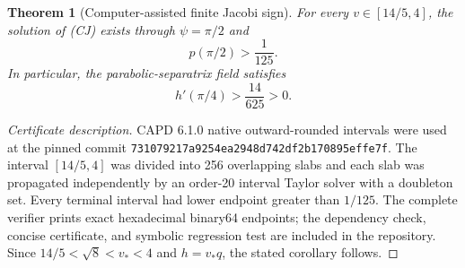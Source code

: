 \documentclass[11pt]{article}
\newtheorem{theorem}{Theorem}
\begin{document}
\begin{theorem}[Computer-assisted finite Jacobi sign]
For every $v\in[14/5,4]$, the solution of \emph{(CJ)} exists through
$\psi=\pi/2$ and
\[
p(\pi/2)>\frac1{125}.
\]
In particular, the parabolic-separatrix field satisfies
\[
h'(\pi/4)>\frac{14}{625}>0.
\]
\end{theorem}
\begin{proof}[Certificate description]
CAPD 6.1.0 native outward-rounded intervals were used at the pinned commit
\texttt{731079217a9254ea2948d742df2b170895effe7f}. The interval
$[14/5,4]$ was divided into 256 overlapping slabs and each slab was propagated
independently by an order-20 interval Taylor solver with a doubleton set.
Every terminal interval had lower endpoint greater than $1/125$. The complete
verifier prints exact hexadecimal binary64 endpoints; the dependency check,
concise certificate, and symbolic regression test are included in the
repository. Since $14/5<\sqrt8<v_*<4$ and $h=v_*q$, the stated corollary
follows.
\end{proof}
\end{document}
